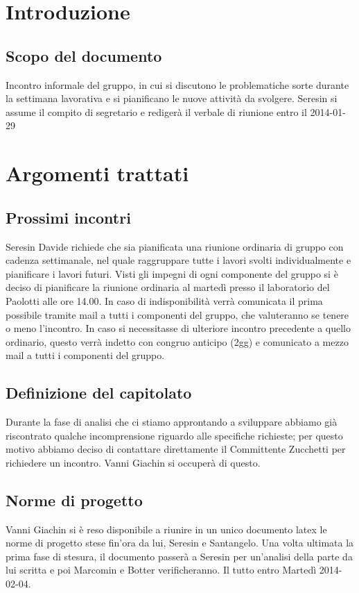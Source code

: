 
\section{Introduzione}

\subsection{Scopo del documento}
Incontro informale del gruppo, in cui si discutono le problematiche sorte durante la settimana lavorativa e si pianificano le nuove attività da svolgere. Seresin si assume il compito di segretario e redigerà il verbale di riunione entro il 2014-01-29\\

\section{Argomenti trattati}
\subsection{Prossimi incontri}
Seresin Davide richiede che sia pianificata una riunione ordinaria di gruppo con cadenza settimanale, nel quale raggruppare tutte i lavori svolti individualmente e pianificare i lavori futuri. Visti gli impegni di ogni componente del gruppo si è deciso di pianificare la riunione ordinaria al martedì presso il laboratorio del Paolotti alle ore 14.00.
In caso di indisponibilità verrà comunicata il prima possibile tramite mail a tutti i componenti del gruppo, che valuteranno se tenere o meno l'incontro.
In caso si necessitasse di ulteriore incontro precedente a quello ordinario, questo verrà indetto con congruo anticipo (2gg) e comunicato a mezzo mail a tutti i componenti del gruppo.\\
\subsection{Definizione del capitolato}
Durante la fase di analisi che ci stiamo approntando a sviluppare abbiamo già riscontrato qualche incomprensione riguardo alle specifiche richieste; per questo motivo abbiamo deciso di contattare direttamente il Committente Zucchetti per richiedere un incontro. Vanni Giachin si occuperà di questo.\\
\subsection{Norme di progetto}
Vanni Giachin si è reso disponibile a riunire in un unico documento latex le norme di progetto stese fin'ora da lui, Seresin e Santangelo. Una volta ultimata la prima fase di stesura, il documento passerà a Seresin per un'analisi della parte da lui scritta e poi Marcomin e Botter verificheranno. Il tutto entro Martedì 2014-02-04.
